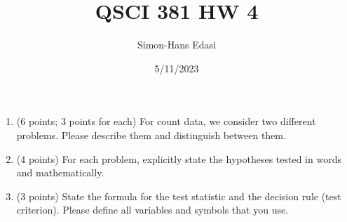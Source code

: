 \documentclass{article}
\title{QSCI 381 HW 4}
\date{5/11/2023}
\author{Simon-Hans Edasi}
\begin{document}
	\maketitle






\begin{enumerate}
	\item (6 points; 3 points for each) For count data, we consider two different problems. Please describe them and distinguish between them.

	\item (4 points) For each problem, explicitly state the hypotheses tested in words and mathematically.
	
	\item (3 points) State the formula for the test statistic and the decision rule (test criterion). Please define all variables and symbols that you use.
	
	
\end{enumerate}
\end{document}
